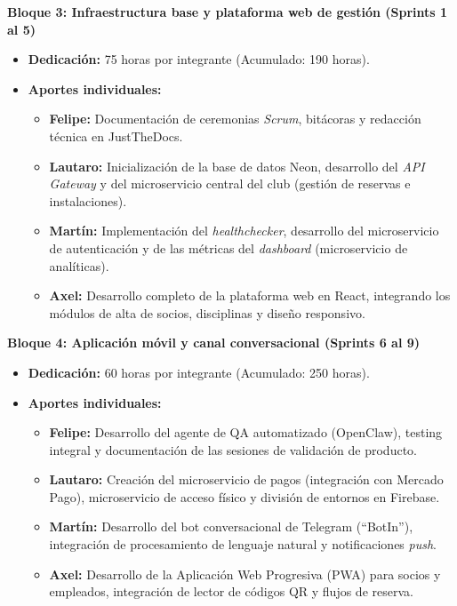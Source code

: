 \textbf{Bloque 3: Infraestructura base y plataforma web de gestión (Sprints 1 al 5)}
\begin{itemize}
    \item \textbf{Dedicación:} 75 horas por integrante (Acumulado: 190 horas).
    \item \textbf{Aportes individuales:}
    \begin{itemize}
        \item \textbf{Felipe:} Documentación de ceremonias \textit{Scrum}, bitácoras y redacción técnica en JustTheDocs.
        \item \textbf{Lautaro:} Inicialización de la base de datos Neon, desarrollo del \textit{API Gateway} y del microservicio central del club (gestión de reservas e instalaciones).
        \item \textbf{Martín:} Implementación del \textit{healthchecker}, desarrollo del microservicio de autenticación y de las métricas del \textit{dashboard} (microservicio de analíticas).
        \item \textbf{Axel:} Desarrollo completo de la plataforma web en React, integrando los módulos de alta de socios, disciplinas y diseño responsivo.
    \end{itemize}
\end{itemize}

\textbf{Bloque 4: Aplicación móvil y canal conversacional (Sprints 6 al 9)}
\begin{itemize}
    \item \textbf{Dedicación:} 60 horas por integrante (Acumulado: 250 horas).
    \item \textbf{Aportes individuales:}
    \begin{itemize}
        \item \textbf{Felipe:} Desarrollo del agente de QA automatizado (OpenClaw), testing integral y documentación de las sesiones de validación de producto.
        \item \textbf{Lautaro:} Creación del microservicio de pagos (integración con Mercado Pago), microservicio de acceso físico y división de entornos en Firebase.
        \item \textbf{Martín:} Desarrollo del bot conversacional de Telegram (``BotIn''), integración de procesamiento de lenguaje natural y notificaciones \textit{push}.
        \item \textbf{Axel:} Desarrollo de la Aplicación Web Progresiva (PWA) para socios y empleados, integración de lector de códigos QR y flujos de reserva.
    \end{itemize}
\end{itemize}


